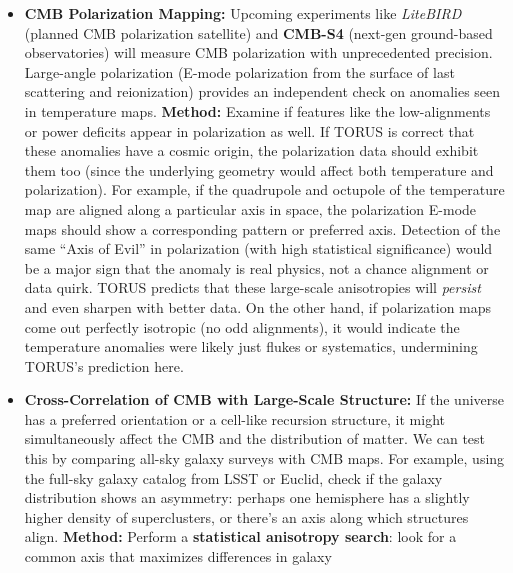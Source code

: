\documentclass[
]{article}
\begin{document}
{\begin{itemize}
  \begin{itemize}
  \item
    \textbf{CMB Polarization Mapping:} Upcoming experiments like
    \emph{LiteBIRD} (planned CMB polarization satellite) and
    \textbf{CMB-S4} (next-gen ground-based observatories) will measure
    CMB polarization with unprecedented precision. Large-angle
    polarization (E-mode polarization from the surface of last
    scattering and reionization) provides an independent check on
    anomalies seen in temperature maps\hspace{0pt}. \textbf{Method:}
    Examine if features like the low-\ell alignments or power deficits
    appear in polarization as well. If TORUS is correct that these
    anomalies have a cosmic origin, the polarization data should exhibit
    them too (since the underlying geometry would affect both
    temperature and polarization). For example, if the quadrupole and
    octupole of the temperature map are aligned along a particular axis
    in space, the polarization E-mode maps should show a corresponding
    pattern or preferred axis\hspace{0pt}. Detection of the same ``Axis
    of Evil'' in polarization (with high statistical significance) would
    be a major sign that the anomaly is real physics, not a chance
    alignment or data quirk\hspace{0pt}. TORUS predicts that these
    large-scale anisotropies will \emph{persist} and even sharpen with
    better data\hspace{0pt}. On the other hand, if polarization maps
    come out perfectly isotropic (no odd alignments), it would indicate
    the temperature anomalies were likely just flukes or systematics,
    undermining TORUS's prediction here\hspace{0pt}.
  \item
    \textbf{Cross-Correlation of CMB with Large-Scale Structure:} If the
    universe has a preferred orientation or a cell-like recursion
    structure, it might simultaneously affect the CMB and the
    distribution of matter. We can test this by comparing all-sky galaxy
    surveys with CMB maps\hspace{0pt}. For example, using the full-sky
    galaxy catalog from LSST or Euclid, check if the galaxy distribution
    shows an asymmetry: perhaps one hemisphere has a slightly higher
    density of superclusters, or there's an axis along which structures
    align. \textbf{Method:} Perform a \textbf{statistical anisotropy
    search}: look for a common axis that maximizes differences in galaxy

\end{itemize}
\end{itemize}}
\end{document}
